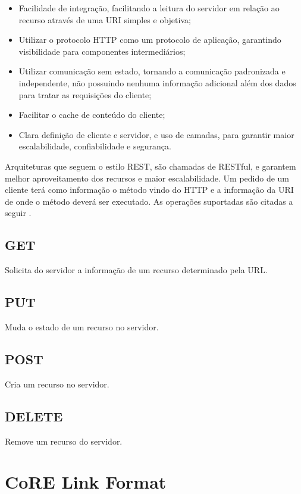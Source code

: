\begin{itemize}
	\item Facilidade de integração, facilitando a leitura do servidor em relação ao recurso através de uma URI simples e objetiva;
	\item Utilizar o protocolo HTTP como um protocolo de aplicação, garantindo visibilidade para componentes intermediários;	
	\item Utilizar comunicação sem estado, tornando a comunicação padronizada e independente, não possuindo nenhuma informação adicional além dos dados para tratar as requisições do cliente;
	\item Facilitar o cache de conteúdo do cliente;
	\item Clara definição de cliente e servidor, e uso de camadas, para garantir maior escalabilidade, confiabilidade e segurança.		
\end{itemize}
Arquiteturas que seguem o estilo REST, são chamadas de RESTful, e garantem melhor aproveitamento dos recursos e maior escalabilidade. Um pedido de um cliente terá como informação o método vindo do HTTP e a informação da URI de onde o método deverá ser executado. As operações suportadas são citadas a seguir\cite{fielding_rest} \cite{gomes_rest_url} .

\subsection{GET}
Solicita do servidor a informação de um recurso determinado pela URL.

\subsection{PUT}

Muda o estado de um recurso no servidor.

\subsection{POST}
Cria um recurso no servidor.

\subsection{DELETE}
Remove um recurso do servidor.

\section{CoRE Link Format}

